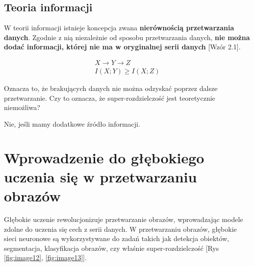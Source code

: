 \subsection*{Teoria informacji}

W teorii informacji istnieje koncepcja zwana \textbf{nierównością przetwarzania danych}. Zgodnie z nią niezależnie od sposobu przetwarzania danych, \textbf{nie można dodać informacji, której nie ma w oryginalnej serii danych}  [Wzór 2.1].

\begin{equation}
    \begin{gathered}
    X \rightarrow Y \rightarrow Z \\
    I(X ; Y) \geq I(X ; Z)
    \end{gathered}
\end{equation}

Oznacza to, że brakujących danych nie można odzyskać poprzez dalsze przetwarzanie. Czy to oznacza, że super-rozdzielczość jest teoretycznie niemożliwa? 

Nie, jeśli mamy dodatkowe źródło informacji. 



\section{Wprowadzenie do głębokiego uczenia się w przetwarzaniu obrazów}


Głębokie uczenie rewolucjonizuje przetwarzanie obrazów, wprowadzając modele zdolne do uczenia się cech z serii danych. W przetwarzaniu obrazów, głębokie sieci neuronowe są wykorzystywane do zadań takich jak detekcja obiektów, segmentacja, klasyfikacja obrazów, czy właśnie super-rozdzielczość [Rys \ref{fig:image12},  \ref{fig:image13}].


